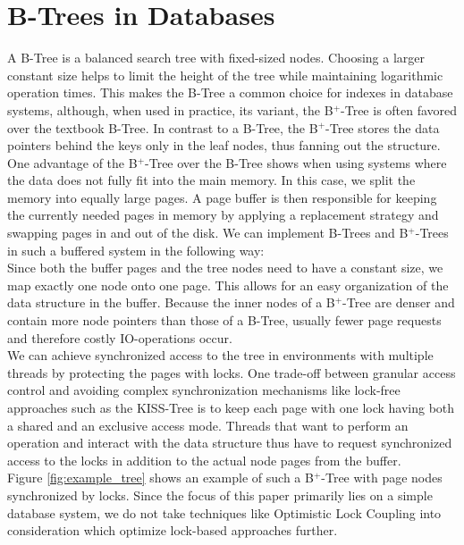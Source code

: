\documentclass[acmlarge,nonacm,dvipsnames]{acmart}
\begin{document}
\section{B-Trees in Databases}
A B-Tree is a balanced search tree with fixed-sized nodes. Choosing a larger constant size helps to limit the height of the tree while maintaining logarithmic operation times. This makes the B-Tree a common choice for indexes in database systems, although, when used in practice, its variant, the B$^+$-Tree is often favored over the textbook B-Tree. In contrast to a B-Tree, the B$^+$-Tree stores the data pointers behind the keys only in the leaf nodes, thus fanning out the structure.\\
One advantage of the B$^+$-Tree over the B-Tree shows when using systems where the data does not fully fit into the main memory. In this case, we split the memory into equally large pages. A page buffer is then responsible for keeping the currently needed pages in memory by applying a replacement strategy and swapping pages in and out of the disk. We can implement B-Trees and B$^+$-Trees in such a buffered system in the following way:\\
Since both the buffer pages and the tree nodes need to have a constant size, we map exactly one node onto one page. This allows for an easy organization of the data structure in the buffer. Because the inner nodes of a B$^+$-Tree are denser and contain more node pointers than those of a B-Tree, usually fewer page requests and therefore costly IO-operations occur.\\
We can achieve synchronized access to the tree in environments with multiple threads by protecting the pages with locks. One trade-off between granular access control and avoiding complex synchronization mechanisms like lock-free approaches such as the KISS-Tree \cite{kiss_tree} is to keep each page with one lock having both a shared and an exclusive access mode. Threads that want to perform an operation and interact with the data structure thus have to request synchronized access to the locks in addition to the actual node pages from the buffer.\\
Figure \ref{fig:example_tree} shows an example of such a B$^+$-Tree with page nodes synchronized by locks. Since the focus of this paper primarily lies on a simple database system, we do not take techniques like Optimistic Lock Coupling \cite{optimistic_locks} into consideration which optimize lock-based approaches further.  
\end{document}
